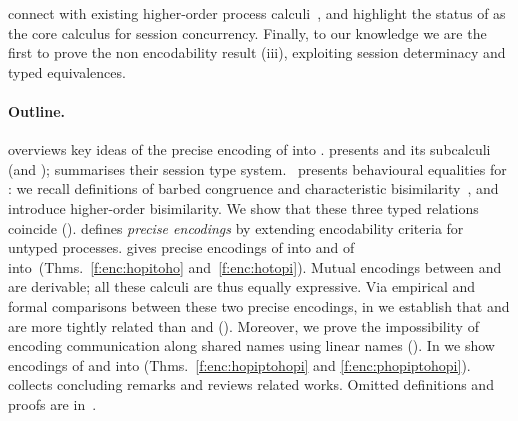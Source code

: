\documentclass[runningheads]{llncs}
\begin{document}
connect \HOp with existing higher-order process calculi~\cite{tlca07}, and  
 highlight the status of \HO as the core calculus for session concurrency.
Finally, %
to our knowledge we are the first to prove 
the non encodability result (iii),
exploiting session determinacy and typed equivalences.




\paragraph{Outline.} 
 overviews key ideas of the precise encoding of \HOp into \sessp.
{} presents \HOp and its 
subcalculi (\HO and \sessp); %
 summarises their session type system.
~pres\-ents  behavioural equalities for \HOp:
we recall definitions of barbed congruence and characteristic bisimilarity~\cite{characteristic_bis}, 
and introduce higher-order bisimilarity.
We show that these three typed relations coincide ().
 defines \emph{precise %
encodings} by extending encodability criteria  for untyped processes. %
{} %
gives {precise encodings} of \HOp into \HO and of \HOp into~\sessp (Thms.~\ref{f:enc:hopitoho} and~\ref{f:enc:hotopi}).
Mutual encodings between \sessp and \HO are derivable; 
all these calculi are thus equally expressive.
Via
empirical and formal comparisons between these two precise encodings, in  we establish that
\HOp and \HO are more tightly related than \HOp and \sessp ().
Moreover, we prove the impossibility of encoding communication along shared names
using linear names ().
In  %
we show 
encodings of \HOpp and \PHOp 
into \HOp
(Thms.~\ref{f:enc:hopiptohopi} and \ref{f:enc:phopiptohopi}).
{} collects concluding remarks and reviews related works.
{Omitted definitions and  proofs are  %
in~\cite{KouzapasPY15}.} 
\end{document}
